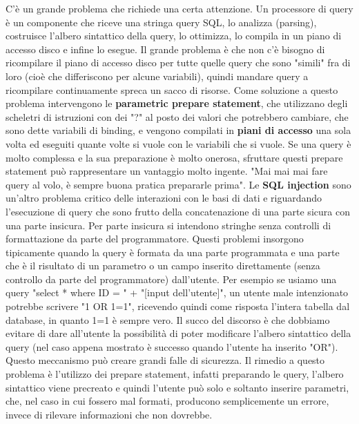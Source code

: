 \newline
C'è un grande problema che richiede una certa attenzione. Un processore di query è un componente che riceve una stringa query SQL, lo analizza (parsing), costruisce l'albero sintattico della query, lo ottimizza, lo compila in un piano di accesso disco e infine lo esegue. Il grande problema è che non c'è bisogno di ricompilare il piano di accesso disco per tutte quelle query che sono "simili" fra di loro (cioè che differiscono per alcune variabili), quindi mandare query a ricompilare continuamente spreca un sacco di risorse. Come soluzione a questo problema intervengono le \textbf{parametric prepare statement}, che utilizzano degli scheletri di istruzioni con dei "?" al posto dei valori che potrebbero cambiare, che sono dette variabili di binding, e vengono compilati in \textbf{piani di accesso} una sola volta ed eseguiti quante volte si vuole con le variabili che si vuole. Se una query è molto complessa e la sua preparazione è molto onerosa, sfruttare questi prepare statement può rappresentare un vantaggio molto ingente.\newline
\newline
"Mai mai mai fare query al volo, è sempre buona pratica prepararle prima". \newline
\newline
Le \textbf{SQL injection} sono un'altro problema critico delle interazioni con le basi di dati e riguardando l'esecuzione di query che sono frutto della concatenazione di una parte sicura con una parte insicura.\newline
Per parte insicura si intendono stringhe senza controlli di formattazione da parte del programmatore. Questi problemi insorgono tipicamente quando la query è formata da una parte programmata e una parte che è il risultato di un parametro o un campo inserito direttamente (senza controllo da parte del programmatore) dall'utente. Per esempio se usiamo una query "select * where ID = " + "[input dell'utente]", un utente male intenzionato potrebbe scrivere "1 OR 1=1", ricevendo quindi come risposta l'intera tabella dal database, in quanto 1=1 è sempre vero. Il succo del discorso è che dobbiamo evitare di dare all'utente la possibilità di poter modificare l'albero sintattico della query (nel caso appena mostrato è successo quando l'utente ha inserito "OR"). Questo meccanismo può creare grandi falle di sicurezza.\newline
Il rimedio a questo problema è l'utilizzo dei prepare statement, infatti preparando le query, l'albero sintattico viene precreato e quindi l'utente può solo e soltanto inserire parametri, che, nel caso in cui fossero mal formati, producono semplicemente un errore, invece di rilevare informazioni che non dovrebbe.